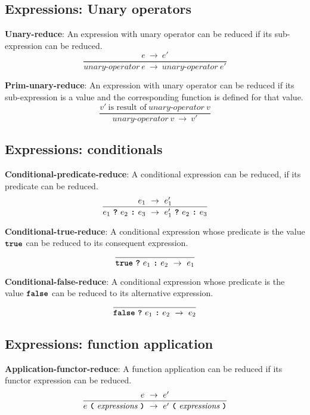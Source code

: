 \subsection*{Expressions: Unary operators}

\textbf{Unary-reduce}: An expression with unary operator
can be reduced if its sub-expression can be reduced.
\[
\frac{
  e \ \rightarrow \ e'
}{
  \textit{unary-operator} \ e
  \ \rightarrow \ 
  \textit{unary-operator} \ e'
}
\]

\vspace{10mm}
\textbf{Prim-unary-reduce}: An expression with unary operator
can be reduced if its sub-expression is a value and
the corresponding function is defined for that value.
\[
\frac{
  v'\ \mbox{is result of}\ \textit{unary-operator} \ v
}{
  \textit{unary-operator} \ v
  \ \rightarrow \ 
  v'
}
\]

\subsection*{Expressions: conditionals}

\textbf{Conditional-predicate-reduce}: A conditional
expression can be reduced, if its predicate can be reduced.
\[
\frac{
  e_1 \ \rightarrow \ e_1'
}{
  e_1\  \textbf{\texttt{?}}\ e_2\ \textbf{\texttt{:}}\ e_3
  \ \rightarrow \ 
  e_1'\ \textbf{\texttt{?}}\ e_2\ \textbf{\texttt{:}}\ e_3
}
\]

\vspace{10mm}
\textbf{Conditional-true-reduce}: A conditional
expression whose predicate is the value
$\textbf{\texttt{true}}$
can be reduced to its consequent expression.
\[
\frac{
}{
  \textbf{\texttt{true}}\  \textbf{\texttt{?}}\ e_1\ \textbf{\texttt{:}}\ e_2
  \ \rightarrow \ 
  e_1
}
\]

\vspace{10mm}
\textbf{Conditional-false-reduce}: A conditional
expression whose predicate is the value
$\textbf{\texttt{false}}$
can be reduced to its alternative expression.
\[
\frac{
}{
  \textbf{\texttt{false}}\  \textbf{\texttt{?}}\ e_1\ \textbf{\texttt{:}}\ e_2
  \ \rightarrow \ 
  e_2
}
\]


\subsection*{Expressions: function application}

\textbf{Application-functor-reduce}: A function application
can be reduced if its functor expression can be reduced.
\[
\frac{
  e \ \rightarrow \ e'
}{
  e\  \textbf{\texttt{(}}\ \textit{expressions} \ \textbf{\texttt{)}}
  \ \rightarrow \ 
  e'\  \textbf{\texttt{(}}\ \textit{expressions} \ \textbf{\texttt{)}}
}
\]


